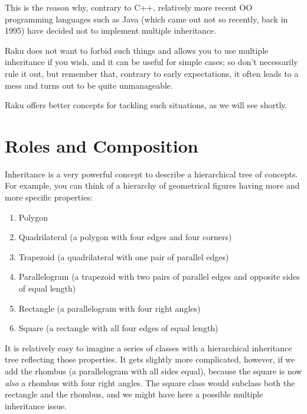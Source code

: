 This is the reason why, contrary to C++, relatively more recent 
OO programming languages such as Java (which came out not 
so recently, back in 1995) have decided not to implement 
multiple inheritance.

Raku does not want to forbid such things and allows you 
to use multiple inheritance if you wish, and it can be useful 
for simple cases; so don't necessarily rule it out, but 
remember that, contrary to early expectations, it often 
leads to a mess and turns out to be quite unmanageable.

Raku offers better concepts for tackling such situations,
as we will see shortly.

\section{Roles and Composition}

Inheritance is a very powerful concept to describe a hierarchical 
tree of concepts. For example, you can think of a hierarchy of 
geometrical figures having more and more specific properties: 
\begin{enumerate}
\item Polygon

\item Quadrilateral (a polygon with four edges and four corners)

\item Trapezoid (a quadrilateral with one pair of parallel edges)

\item Parallelogram (a trapezoid with two pairs of parallel 
edges and opposite sides of equal length)

\item Rectangle (a parallelogram with four right angles)

\item Square (a rectangle with all four edges of equal length)
\end{enumerate}

It is relatively easy to imagine a series of classes with a 
hierarchical inheritance tree reflecting those properties. It 
gets slightly more complicated, however, if we add the rhombus 
(a parallelogram with all sides equal), because the square is 
now \emph{also} a rhombus with four right angles. 
The square class would subclass both the rectangle and the 
rhombus, and we might have here a possible multiple inheritance 
issue.

